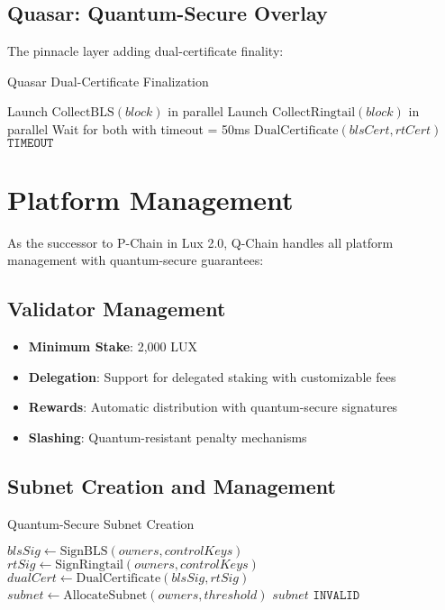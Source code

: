 \documentclass[11pt]{article}
\begin{document}
\subsection{Quasar: Quantum-Secure Overlay}

The pinnacle layer adding dual-certificate finality:

\begin{algorithm}[H]
\caption{Quasar Dual-Certificate Finalization}
\begin{algorithmic}[1]
    \State Launch $\text{CollectBLS}(block)$ in parallel
    \State Launch $\text{CollectRingtail}(block)$ in parallel
    \State Wait for both with timeout = 50ms
        \State \Return $\text{DualCertificate}(blsCert, rtCert)$
    \Else
        \State \Return $\texttt{TIMEOUT}$ 
    \EndIf
\EndFunction
\end{algorithmic}
\end{algorithm}

\section{Platform Management}

As the successor to P-Chain in Lux 2.0, Q-Chain handles all platform management with quantum-secure guarantees:

\subsection{Validator Management}

\begin{itemize}
\item \textbf{Minimum Stake}: 2,000 LUX
\item \textbf{Delegation}: Support for delegated staking with customizable fees
\item \textbf{Rewards}: Automatic distribution with quantum-secure signatures
\item \textbf{Slashing}: Quantum-resistant penalty mechanisms
\end{itemize}

\subsection{Subnet Creation and Management}

\begin{algorithm}[H]
\caption{Quantum-Secure Subnet Creation}
\begin{algorithmic}[1]
    \State $blsSig \gets \text{SignBLS}(owners, controlKeys)$
    \State $rtSig \gets \text{SignRingtail}(owners, controlKeys)$
    \State $dualCert \gets \text{DualCertificate}(blsSig, rtSig)$
        \State $subnet \gets \text{AllocateSubnet}(owners, threshold)$
        \State \Return $subnet$
    \EndIf
    \State \Return $\texttt{INVALID}$
\EndFunction
\end{algorithmic}
\end{algorithm}
\end{document}
